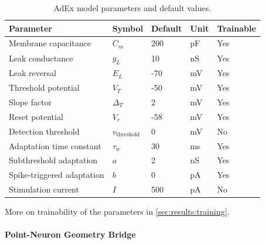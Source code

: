 \begin{table}[t]
\centering
\caption{\gls{AdEx} model parameters and default values.}
\label{tab:adex_params}
\begin{tabular}{lllll}
\toprule
\textbf{Parameter} & \textbf{Symbol} & \textbf{Default} & \textbf{Unit} & \textbf{Trainable} \\
\midrule
Membrane capacitance & $C_m$ & 200 & pF & Yes\\
Leak conductance & $g_L$ & 10 & nS & Yes\\
Leak reversal & $E_L$ & -70 & mV & Yes \\
Threshold potential & $V_T$ & -50 & mV & Yes\\
Slope factor & $\Delta_T$ & 2 & mV & Yes\\
Reset potential & $V_r$ & -58 & mV & Yes \\
Detection threshold & $v_{\text{threshold}}$ & 0 & mV & No \\
Adaptation time constant & $\tau_w$ & 30 & ms & Yes\footnotemark[2]\\
Subthreshold adaptation & $a$ & 2 & nS & Yes\footnotemark[2] \\
Spike-triggered adaptation & $b$ & 0 & pA & Yes\footnotemark[2] \\
Stimulation current & $I$ & 500 & pA & No \\
\bottomrule
\end{tabular}
\end{table}

More on trainability of the parameters in \cref{sec:results:training}.

\paragraph*{Point-Neuron Geometry Bridge}\label{sec:method:adex:geometry-bridge}

